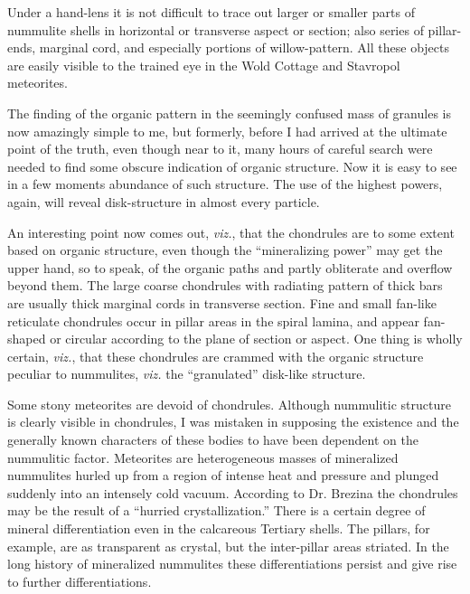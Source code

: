 \documentclass[a4paper, 12pt, oneside]{article}
\begin{document}
Under a hand-lens it is not difficult to trace out larger or smaller parts of nummulite shells in horizontal or transverse aspect or section; also series of pillar-ends, marginal cord, and especially portions of willow-pattern. All these objects are easily visible to the trained eye in the Wold Cottage and Stavropol meteorites.

The finding of the organic pattern in the seemingly confused mass of granules is now amazingly simple to me, but formerly, before I had arrived at the ultimate point of the truth, even though near to it, many hours of careful search were needed to find some obscure indication of organic structure. Now it is easy to see in a few moments abundance of such structure. The use of the highest powers, again, will reveal disk-structure in almost every particle.

An interesting point now comes out, \emph{viz.}, that the chondrules are to some extent based on organic structure, even though the ``mineralizing power'' may get the upper hand, so to speak, of the organic paths and partly obliterate and overflow beyond them. The large coarse chondrules with radiating pattern of thick bars are usually thick marginal cords in transverse section. Fine and small fan-like reticulate chondrules occur in pillar areas in the spiral lamina, and appear fan-shaped or circular according to the plane of section or aspect. One thing is wholly certain, \emph{viz.}, that these chondrules are crammed with the organic structure peculiar to nummulites, \emph{viz.} the ``granulated'' disk-like structure.

Some stony meteorites are devoid of chondrules. Although nummulitic structure is clearly visible in chondrules, I was mistaken in supposing the existence and the generally known characters of these bodies to have been dependent on the nummulitic factor. Meteorites are heterogeneous masses of mineralized nummulites hurled up from a region of intense heat and pressure and plunged suddenly into an intensely cold vacuum. According to Dr. Brezina the chondrules may be the result of a ``hurried crystallization.'' There is a certain degree of mineral differentiation even in the calcareous Tertiary shells. The pillars, for example, are as transparent as crystal, but the inter-pillar areas striated. In the long history of mineralized nummulites these differentiations persist and give rise to further differentiations.
\end{document}
